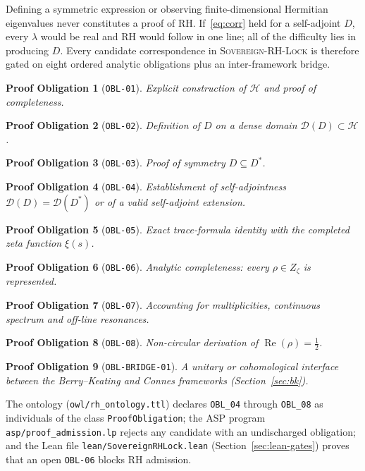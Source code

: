 \documentclass[11pt,letterpaper]{article}
\newtheorem{obligation}{Proof Obligation}
\newcommand{\code}[1]{\texttt{#1}}
\begin{document}
Defining a symmetric expression or observing finite-dimensional Hermitian eigenvalues never constitutes a proof of RH. If~\eqref{eq:corr} held for a self-adjoint $D$, every $\lambda$ would be real and RH would follow in one line; all of the difficulty lies in producing $D$. Every candidate correspondence in \textsc{Sovereign-RH-Lock} is therefore gated on eight ordered analytic obligations plus an inter-framework bridge.

\begin{obligation}[\texttt{OBL-01}] Explicit construction of $\mathcal{H}$ and proof of completeness. \end{obligation}
\begin{obligation}[\texttt{OBL-02}] Definition of $D$ on a dense domain $\mathcal{D}(D) \subset \mathcal{H}$. \end{obligation}
\begin{obligation}[\texttt{OBL-03}] Proof of symmetry $D \subseteq D^*$. \end{obligation}
\begin{obligation}[\texttt{OBL-04}] Establishment of self-adjointness $\mathcal{D}(D) = \mathcal{D}(D^*)$ or of a valid self-adjoint extension. \end{obligation}
\begin{obligation}[\texttt{OBL-05}] Exact trace-formula identity with the completed zeta function $\xi(s)$. \end{obligation}
\begin{obligation}[\texttt{OBL-06}] Analytic completeness: every $\rho \in Z_\zeta$ is represented. \end{obligation}
\begin{obligation}[\texttt{OBL-07}] Accounting for multiplicities, continuous spectrum and off-line resonances. \end{obligation}
\begin{obligation}[\texttt{OBL-08}] Non-circular derivation of $\operatorname{Re}(\rho) = \frac{1}{2}$. \end{obligation}
\begin{obligation}[\texttt{OBL-BRIDGE-01}] A unitary or cohomological interface between the Berry--Keating and Connes frameworks (Section~\ref{sec:bk}). \end{obligation}

The ontology (\code{owl/rh\_ontology.ttl}) declares \code{OBL\_04} through \code{OBL\_08} as individuals of the class \code{ProofObligation}; the ASP program \code{asp/proof\_admission.lp} rejects any candidate with an undischarged obligation; and the Lean file \code{lean/SovereignRHLock.lean} (Section~\ref{sec:lean-gates}) proves that an open \code{OBL-06} blocks RH admission.
\end{document}
